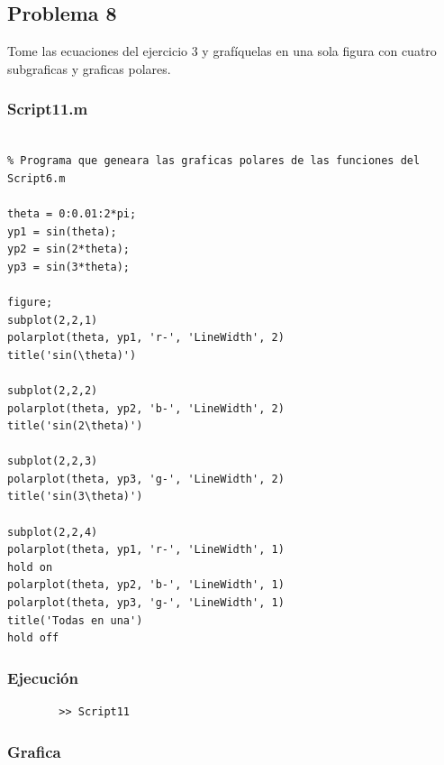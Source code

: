 \documentclass{article}
\begin{document}
	\newpage
	
	\subsection{Problema 8}
	
	Tome las ecuaciones del ejercicio 3 y grafíquelas en una sola figura con cuatro subgraficas y graficas polares.
	
	\subsubsection{Script11.m}
	
	\begin{lstlisting}

% Programa que geneara las graficas polares de las funciones del Script6.m

theta = 0:0.01:2*pi;
yp1 = sin(theta);
yp2 = sin(2*theta);
yp3 = sin(3*theta);

figure;
subplot(2,2,1)
polarplot(theta, yp1, 'r-', 'LineWidth', 2)
title('sin(\theta)')

subplot(2,2,2)
polarplot(theta, yp2, 'b-', 'LineWidth', 2)
title('sin(2\theta)')

subplot(2,2,3)
polarplot(theta, yp3, 'g-', 'LineWidth', 2)
title('sin(3\theta)')

subplot(2,2,4)
polarplot(theta, yp1, 'r-', 'LineWidth', 1)
hold on
polarplot(theta, yp2, 'b-', 'LineWidth', 1)
polarplot(theta, yp3, 'g-', 'LineWidth', 1)
title('Todas en una')
hold off

	\end{lstlisting}
	
	\subsubsection{Ejecución}
	
	\begin{lstlisting}
		>> Script11
	\end{lstlisting}
	
	\newpage
	
	\subsubsection{Grafica}
	
\end{document}
